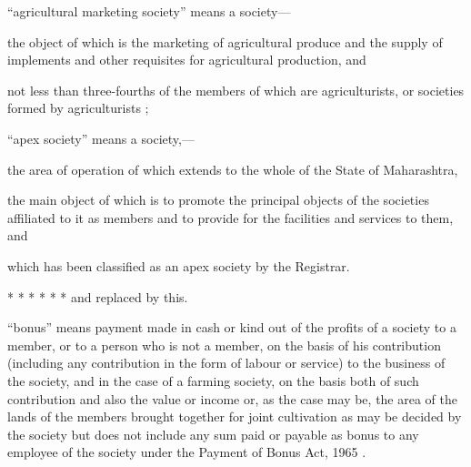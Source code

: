 \documentclass[reprint]{mhact}
\begin{document}
      \begin{subsectionlist}
         ``agricultural marketing society'' means a
        society---

        \begin{clause}

         the object of which is the marketing of
        agricultural produce and the supply of implements and other
        requisites for agricultural production, and

         not less than
        three-fourths of the members of which are agriculturists, or
        societies formed by agriculturists ;
      \end{clause}
      
         ``apex society'' means a society,--- \lblprehook
      \begin{clause}
         the area of operation of which extends
        to the whole of the State of Maharashtra,

         the main object of which is to promote the
        principal objects of the societies affiliated to it as members
        and to provide for the facilities and services to them, and

         which has been classified as an
        apex society by the Registrar.
      \end{clause}

      

      *  * * * * * and replaced by this.

       ``bonus'' means payment made in cash or kind out of
      the profits of a society to a member, or to a person who is not
      a member, on the basis of his contribution (including any
      contribution in the form of labour or service) to the business
      of the society, and in the case of a farming society, on the
      basis both of such contribution and also the value or income or,
      as the case may be, the area of the lands of the members brought
      together for joint cultivation as may be decided by the society
      but does not include any sum paid or payable as bonus to any
      employee of the society under the Payment of Bonus Act,
      1965%
      .
    \end{subsectionlist} 
\end{document}
